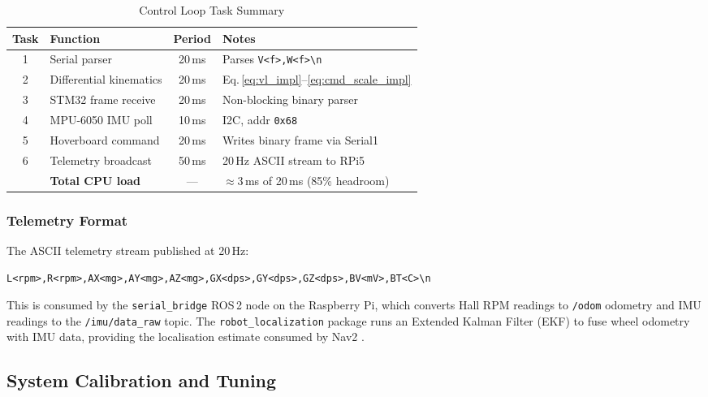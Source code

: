 \documentclass[12pt,a4paper]{report}
\begin{document}
\begin{table}[H]
\centering
\caption{Control Loop Task Summary}
\label{tab:control_tasks_impl}
\begin{tabular}{@{}c p{4.0cm} c p{5.5cm}@{}}
\toprule
\rowcolor{rafblue!20}
\textbf{Task} & \textbf{Function} & \textbf{Period} & \textbf{Notes} \\
\midrule
1 & Serial parser           & 20\,ms & Parses \texttt{V<f>,W<f>{\textbackslash}n} \\
2 & Differential kinematics & 20\,ms & Eq.\,\eqref{eq:vl_impl}--\eqref{eq:cmd_scale_impl} \\
3 & STM32 frame receive     & 20\,ms & Non-blocking binary parser \\
4 & MPU-6050 IMU poll       & 10\,ms & I2C, addr \texttt{0x68} \\
5 & Hoverboard command      & 20\,ms & Writes binary frame via Serial1 \\
6 & Telemetry broadcast     & 50\,ms & 20\,Hz ASCII stream to RPi5 \\
\midrule
  & \textbf{Total CPU load} & —      & $\approx$3\,ms of 20\,ms (85\% headroom) \\
\bottomrule
\end{tabular}
\end{table}

\subsubsection{Telemetry Format}
\label{subsec:telemetry_impl}

The ASCII telemetry stream published at 20\,Hz:

\begin{verbatim}
L<rpm>,R<rpm>,AX<mg>,AY<mg>,AZ<mg>,GX<dps>,GY<dps>,GZ<dps>,BV<mV>,BT<C>\n
\end{verbatim}

This is consumed by the \texttt{serial\_bridge} ROS\,2 node on the Raspberry
Pi, which converts Hall RPM readings to \texttt{/odom} odometry and IMU
readings to the \texttt{/imu/data\_raw} topic. The \texttt{robot\_localization}
package runs an Extended Kalman Filter (EKF) to fuse wheel odometry with IMU
data, providing the localisation estimate consumed by Nav2
\cite{moore2016ekf}.

\subsection{System Calibration and Tuning}
\label{sec:calibration_impl}
\end{document}
